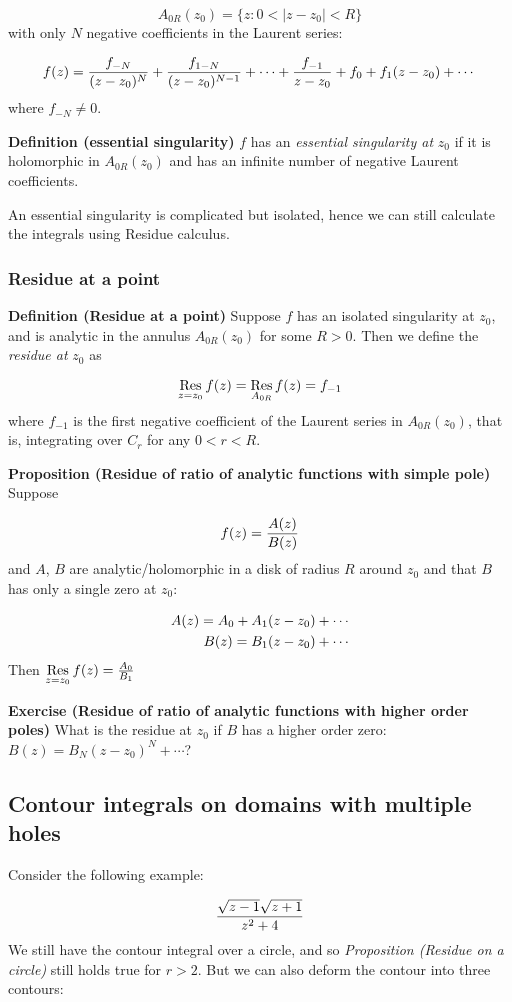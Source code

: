 \documentclass[12pt,a4paper]{article}
\begin{document}
\[
 A_{0R}(z_0) = \{z : 0 < |z - z_0| < R \}
\]
with only $N$ negative coefficients in the Laurent series:

\[
 f(z) = {f_{-N} \over (z - z_0)^N}  + {f_{1-N} \over (z - z_0)^{N-1}} +  \cdots + {f_{-1} \over z-z_0} + f_0 + f_1 (z-z_0) + \cdots
\]
where $f_{-N} \neq 0$.

\textbf{Definition (essential singularity)} $f$ has an \emph{essential singularity at} $z_0$ if it is holomorphic in $A_{0R}(z_0)$ and has an infinite number of negative Laurent coefficients.

An essential singularity is complicated but isolated, hence we can still calculate the integrals using Residue calculus.

\subsubsection{Residue at a point}
\textbf{Definition (Residue at a point)} Suppose $f$ has an isolated singularity at $z_0$, and is analytic in the annulus $A_{0R}(z_0)$ for some $R > 0$. Then we define the \emph{residue at} $z_0$ as

\[
{\underset{z = z_0}{\rm Res}}\, f(z) = {\underset{A_{0R}}{\rm Res}}\, f(z) = f_{-1}
\]
where $f_{-1}$ is the first negative coefficient of the Laurent series in $A_{0R}(z_0)$, that is, integrating over $C_r$ for any $0 < r < R$.

\textbf{Proposition (Residue of ratio of analytic functions with simple pole)} Suppose

\[
f(z) = {A(z) \over B(z)}
\]
and $A$, $B$ are analytic/holomorphic in a disk of radius $R$ around $z_0$ and that $B$ has only a single zero at $z_0$:


\begin{align*}
A(z) = A_0 + A_1(z-z_0) + \cdots \cr
B(z) = B_1(z-z_0) + \cdots
\end{align*}
Then ${\underset{z = z_0}{\rm Res}}\, f(z) = {A_0 \over B_1}$

\textbf{Exercise (Residue of ratio of analytic functions with higher order  poles)} What is the residue at $z_0$ if $B$ has a higher order zero: $B(z) = B_N (z-z_0)^N + \cdots$?

\subsection{Contour integrals on domains with multiple holes}
Consider the following example:

\[
    {\sqrt{z-1}\sqrt{z+1} \over z^2 + 4}
\]
We still have the contour integral over a circle, and so \emph{Proposition (Residue on a circle)} still holds true for $r > 2$. But we can also deform the contour into three contours:
\end{document}

